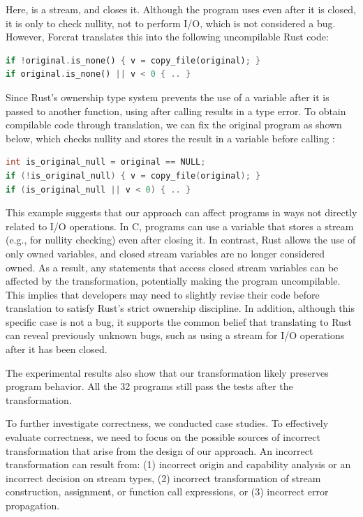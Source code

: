 \noindent
%
Here,  is a stream, and  closes it.
%
Although the program uses  even after it is closed, it is only to
check nullity, not to perform I/O, which is not considered a bug.
%
However, Forcrat translates this into the following uncompilable Rust code:

\begin{lstlisting}[language=Rust]
if !original.is_none() { v = copy_file(original); }
if original.is_none() || v < 0 { .. }
\end{lstlisting}

\noindent
%
Since Rust's ownership type system prevents the use of a variable after it is
passed to another function, using  after calling 
results in a type error.
%
To obtain compilable code through translation, we can fix the original program
as shown below, which checks nullity and stores the result in a variable before
calling :

\begin{lstlisting}[language=C]
int is_original_null = original == NULL;
if (!is_original_null) { v = copy_file(original); }
if (is_original_null || v < 0) { .. }
\end{lstlisting}

This example suggests that our approach can affect programs in ways not directly
related to I/O operations.
%
In C, programs can use a variable that stores a stream (e.g., for nullity
checking) even after closing it.
%
In contrast, Rust allows the use of only owned variables, and closed stream
variables are no longer considered owned.
%
As a result, any statements that access closed stream variables can be affected
by the transformation, potentially making the program uncompilable.
%
This implies that developers may need to slightly revise their code before
translation to satisfy Rust's strict ownership discipline.
%
In addition, although this specific case is not a bug, it supports the common
belief that translating to Rust can reveal previously unknown bugs, such as
using a stream for I/O operations after it has been closed.

The experimental results also show that our transformation likely preserves
program behavior.
%
All the 32 programs still pass the tests after the transformation.

To further investigate correctness, we conducted case studies.
%
To effectively evaluate correctness, we need to focus on the possible sources of
incorrect transformation that arise from the design of our approach.
%
An incorrect transformation can result from:
%
(1) incorrect origin and capability analysis or an incorrect decision on stream
types,
%
(2) incorrect transformation of stream construction, assignment, or function
call expressions, or
%
(3) incorrect error propagation.

